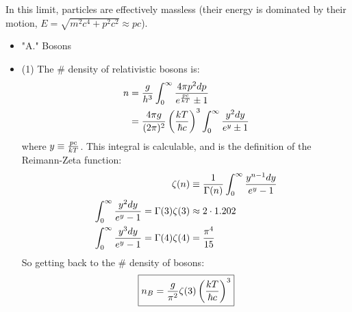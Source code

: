 \documentclass{article}
\def\inv#1{\frac{1}{ #1}}
\begin{document}
In this limit, particles are effectively massless (their energy is 
dominated by their motion, $E=\sqrt{m^2c^4+p^2c^2}\approx pc$).  
\begin{itemize}
\item"A." Bosons
\item{(1)} The \# density of relativistic bosons is:
\begin{align}
n&={g\over h^3}\int_0^\infty{4\pi p^2dp\over e^{pc\over kT}\pm 1}\\
&={4\pi g\over (2\pi)^2}\left({kT\over \hbar c}\right)^3
\int_0^\infty{y^2dy\over e^y\pm 1}\\
\end{align}
where $y\equiv {pc\over kT}$.  This integral is calculable, and is the 
definition of the Reimann-Zeta function:
\begin{align}
\zeta(n)&\equiv\inv{\Gamma(n)}\int_0^\infty{y^{n-1}dy\over e^y-1}\\
\int_0^\infty{y^2dy\over e^y-1}=\Gamma(3)\zeta(3)&\approx 2\cdot 1.202\\
\int_0^\infty{y^3dy\over e^y-1}=\Gamma(4)\zeta(4)&={\pi^4\over 15}\\
\end{align}
So getting back to the \# density of bosons:
$$\boxed{n_B={g\over\pi^2}\zeta(3)\left({kT\over\hbar c}\right)^3}$$


\end{itemize}
\end{document}
